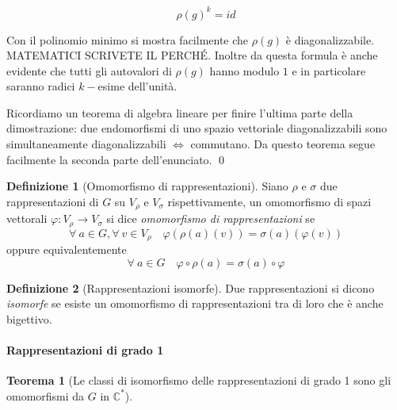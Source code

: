 \documentclass[11pt]{article}
\theoremstyle{plain}
\newtheorem{thm}{Teorema}[section]
\theoremstyle{definition}
\newtheorem{defn}{Definizione}[section]
\theoremstyle{remark}
\newcommand{\C}{\mathbb{C}}
\begin{document}
\[ \rho(g)^k = id\]

Con il polinomio minimo si mostra facilmente che $\rho(g)$ è diagonalizzabile. MATEMATICI SCRIVETE IL PERCH\'E. Inoltre da questa formula è anche evidente che tutti gli autovalori di $\rho(g)$ hanno modulo $1$ e in particolare saranno radici $k-$esime dell'unità.

Ricordiamo un teorema di algebra lineare per finire l'ultima parte della dimostrazione: due endomorfismi di uno spazio vettoriale diagonalizzabili sono simultaneamente diagonalizzabili $\Leftrightarrow$ commutano. Da questo teorema segue facilmente la seconda parte dell'enunciato. \qed





\begin{defn}[Omomorfismo di rappresentazioni]
Siano $\rho$ e $\sigma$ due rappresentazioni di $G$ su $V_{\rho}$ e $V_{\sigma}$ rispettivamente, un omomorfismo di spazi vettorali $\varphi:V_{\rho}\to V_{\sigma}$ si dice \textit{omomorfismo di rappresentazioni} se
\[
	\forall\ a\in G, \forall\ v\in V_{\rho}\quad \varphi(\rho(a)(v)) = \sigma(a)(\varphi(v))
\]
oppure equivalentemente
\[
	\forall\ a\in G\quad \varphi\circ \rho(a) = \sigma(a)\circ \varphi
\]






\end{defn}



\begin{defn}[Rappresentazioni isomorfe]
Due rappresentazioni si dicono \textit{isomorfe} se esiste un omomorfismo di rappresentazioni tra di loro che è anche bigettivo.
\end{defn}




\paragraph{Rappresentazioni di grado 1}

\begin{thm}[Le classi di isomorfismo delle rappresentazioni di grado 1 sono gli omomorfismi da $G$ in $\C^*$]


\end{thm}
\end{document}
